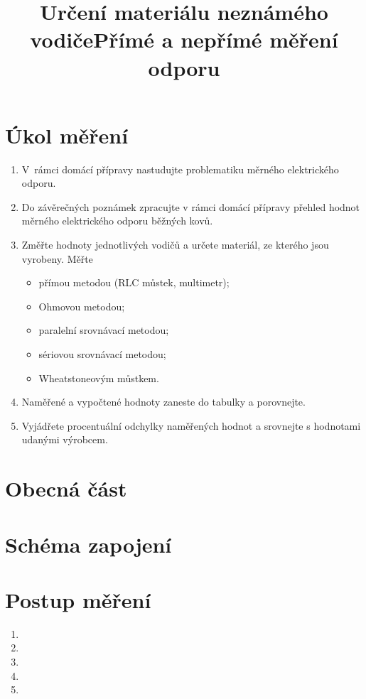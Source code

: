 \documentclass[a4]{article}
\begin{document}
\title{Určení materiálu neznámého vodiče}
\author{} %
\date{}

\title{Přímé a nepřímé měření odporu}

\section{Úkol měření}
\begin{enumerate}
    \item V rámci domácí přípravy nastudujte problematiku měrného elektrického odporu.
    \item Do závěrečných poznámek zpracujte v rámci domácí přípravy přehled hodnot měrného elektrického odporu běžných kovů.
    \item Změřte hodnoty jednotlivých vodičů a určete materiál, ze kterého jsou vyrobeny. Měřte
    \begin{itemize}
        \item přímou metodou (RLC můstek, multimetr);
        \item Ohmovou metodou;
        \item paralelní srovnávací metodou;
        \item sériovou srovnávací metodou;
        \item Wheatstoneovým můstkem.
    \end{itemize}
    \item Naměřené a vypočtené hodnoty zaneste do tabulky a porovnejte.
    \item Vyjádřete procentuální odchylky naměřených hodnot a srovnejte s hodnotami udanými výrobcem.
\end{enumerate}

\section{Obecná část}%

\section{Schéma zapojení}

\section{Postup měření}
\begin{enumerate}
    \item
    \item
    \item
    \item
    \item
\end{enumerate}
\end{document}
